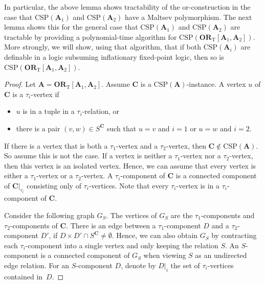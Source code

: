 \documentclass[a4paper,english, thm-restate]{lipics-v2021}
\newcommand{\vertA}{u}
\newcommand{\vertB}{v}
\newcommand{\vertC}{w}
\newcommand{\sig}{\tau}
\newcommand{\StructA}{\mathbf{A}}
\newcommand{\StructC}{\mathbf{C}}
\newcommand{\CSP}[1]{\mathrm{CSP}(#1)}
\newcommand{\restrict}[2]{#1|_{#2}}
\newcommand{\ORT}[1]{\mathbf{OR}_\text{T}[#1]}
\begin{document}
	\noindent In particular, the above lemma shows tractability of the or-construction in the case that $\CSP{\StructA_1}$ and $\CSP{\StructA_2}$ have a Maltsev polymorphism.
	The next lemma shows this for the general case that $\CSP{\StructA_1}$ and $\CSP{\StructA_2}$ are tractable by providing a polynomial-time algorithm
	for $\CSP{\ORT{\StructA_1,\StructA_2}}$.
	More strongly, we will show, using that algorithm, that if both $\CSP{\StructA_i}$
	are definable in a logic subsuming inflationary fixed-point logic,
	then so is $\CSP{\ORT{\StructA_1,\StructA_2}}$.
	
	\homOrTractable*
	\begin{proof}
		Let $\StructA = \ORT{\StructA_1,\StructA_2}$.
		Assume $\StructC$ is a $\CSP{\StructA}$-instance.
		A vertex $\vertA$ of $\StructC$ is a $\sig_i$-vertex if 
		\begin{itemize}
			\item $\vertA$ is in a tuple in a  $\sig_i$-relation, or
			\item there is a pair $(\vertB,\vertC) \in S^\StructC$
			such that $\vertA = \vertB$ and $i=1$ or $\vertA=\vertC$ and $i=2$.
		\end{itemize}
		If there is a vertex that is both a $\sig_1$-vertex and a $\sig_2$-vertex,
		then $\StructC \notin \CSP{\StructA}$.
		So assume this is not the case.
		If a vertex is neither a $\sig_1$-vertex nor a $\sig_2$-vertex,
		then this vertex is an isolated vertex.
		Hence, we can assume that every vertex is either a $\sig_1$-vertex or a $\sig_2$-vertex.
		A $\sig_i$-component of $\StructC$ is a connected component of $\restrict{\StructC}{\sig_i}$ 
		consisting only of $\sig_i$-vertices.
		Note that every $\sig_i$-vertex is in a $\sig_i$-component of $\StructC$. 
		
		Consider the following graph $G_S$.
		The vertices of $G_S$ are the $\sig_1$\nobreakdash-components and $\sig_2$\nobreakdash-components of $\StructC$.
		There is an edge between a $\sig_1$-component $D$ and a $\sig_2$-component $D'$,
		if $D\times D' \cap S^\StructC \neq \emptyset$.
		Hence, we can also obtain $G_S$ by contracting each $\sig_i$-component into a single vertex and only keeping the relation $S$.
		An $S$-component is a connected component of $G_S$ when viewing $S$ as an undirected edge relation.
		For an $S$-component $D$, denote by $\restrict{D}{i}$ the set of $\sig_i$-vertices contained in~$D$.
		

\end{proof}
\end{document}
